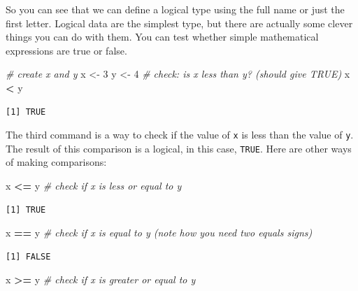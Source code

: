 \documentclass[
]{book}
\newenvironment{Shaded}{\begin{snugshade}}{\end{snugshade}}
\newcommand{\CommentTok}[1]{\textcolor[rgb]{0.56,0.35,0.01}{\textit{#1}}}
\newcommand{\DecValTok}[1]{\textcolor[rgb]{0.00,0.00,0.81}{#1}}
\newcommand{\NormalTok}[1]{#1}
\newcommand{\OperatorTok}[1]{\textcolor[rgb]{0.81,0.36,0.00}{\textbf{#1}}}
\newcommand{\StringTok}[1]{\textcolor[rgb]{0.31,0.60,0.02}{#1}}
\begin{document}
So you can see that we can define a logical type using the full name or just the first letter.
Logical data are the simplest type, but there are actually some clever things you can do with them.
You can test whether simple mathematical expressions are true or false.

\begin{Shaded}
\begin{Highlighting}[]
\CommentTok{# create x and y}
\NormalTok{x <-}\StringTok{ }\DecValTok{3}
\NormalTok{y <-}\StringTok{ }\DecValTok{4}
\CommentTok{# check: is x less than y? (should give TRUE)}
\NormalTok{x }\OperatorTok{<}\StringTok{ }\NormalTok{y}
\end{Highlighting}
\end{Shaded}

\begin{verbatim}
[1] TRUE
\end{verbatim}

The third command is a way to check if the value of \texttt{x} is less than the value of \texttt{y}.
The result of this comparison is a logical, in this case, \texttt{TRUE}.
Here are other ways of making comparisons:

\begin{Shaded}
\begin{Highlighting}[]
\NormalTok{x }\OperatorTok{<=}\StringTok{ }\NormalTok{y  }\CommentTok{# check if x is less or equal to y}
\end{Highlighting}
\end{Shaded}

\begin{verbatim}
[1] TRUE
\end{verbatim}

\begin{Shaded}
\begin{Highlighting}[]
\NormalTok{x }\OperatorTok{==}\StringTok{ }\NormalTok{y  }\CommentTok{# check if x is equal to y (note how you need two equals signs)}
\end{Highlighting}
\end{Shaded}

\begin{verbatim}
[1] FALSE
\end{verbatim}

\begin{Shaded}
\begin{Highlighting}[]
\NormalTok{x }\OperatorTok{>=}\StringTok{ }\NormalTok{y  }\CommentTok{# check if x is greater or equal to y }
\end{Highlighting}
\end{Shaded}
\end{document}

